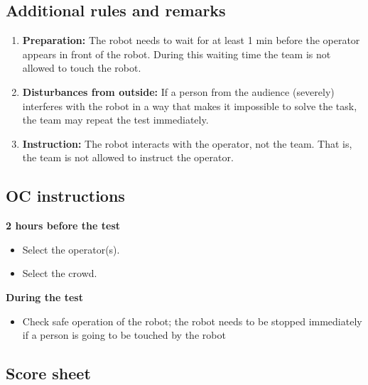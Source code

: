 \subsection{Additional rules and remarks}
\begin{enumerate}
\item \textbf{Preparation:} The robot needs to wait for at least 1 min before the operator appears in front of the robot. During this waiting time the team is not allowed to touch the robot.
\item \textbf{Disturbances from outside:} If a person from the audience (severely) interferes with the robot in a way that makes it impossible to solve the task, the team may repeat the test immediately.
\item \textbf{Instruction:} The robot interacts with the operator, not the team. That is, the team is not allowed to instruct the operator.
\end{enumerate}


%

\subsection{OC instructions}

\textbf{2 hours before the test}
\begin{itemize}
\item Select the  operator(s).
\item Select the crowd.
\end{itemize}

\textbf{During the test}
\begin{itemize}
\item Check safe operation of the robot; the robot needs to be stopped immediately if a person is going to be touched by the robot
\end{itemize}

\subsection{Score sheet}


